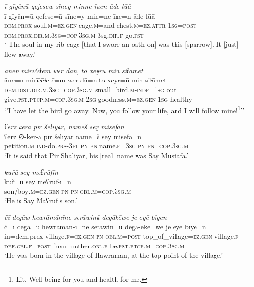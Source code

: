 \ea \label{DP.49}
\textit{ī gīyānū qefesew sīney minne īnen āđe lūā} \\ 
\gll ī gīyān=ū qefese=ū sīne=y min=ne īne=n āđe lūā \\ 
 \textsc{dem.prox} soul\textsc{.m}\textsc{=ez}\textsc{.gen} cage\textsc{.m}=and chest\textsc{.m}\textsc{=ez}.\textsc{attr} \textsc{1sg}\textsc{=\textsc{post}} \textsc{dem.prox}\textsc{.dir}\textsc{.m}\textsc{.3sg}\textsc{=cop}\textsc{.3sg}\textsc{.m} 3sg\textsc{.dir}\textsc{\textsc{.f}} go\textsc{.pst} \\ 
\glt ` The soul in my rib cage [that I swore an oath on] was this [sparrow]. It [just] flew away.'
\z 
 
\ea \label{DP.50}
\textit{ānen mirīčēɫēm wer dān, to xeyrū min siɫāmet} \\ 
\gll āne=n mirīčēɫe-ē=m wer dā=n to xeyr=ū min siɫāmet \\ 
 \textsc{dem.dist}\textsc{.dir}\textsc{.m}\textsc{.3sg}\textsc{=cop}\textsc{.3sg}\textsc{.m} small\_bird\textsc{.m}\textsc{-indf}\textsc{=1sg} out give\textsc{.pst}\textsc{.ptcp}\textsc{.m}\textsc{=cop}\textsc{.3sg}\textsc{.m} \textsc{2sg} goodness\textsc{.m}\textsc{=ez}\textsc{.gen} \textsc{1sg} healthy \\ 
\glt `’I have let the bird go away. Now, you follow your life, and I will follow mine!\footnote{Lit. Well-being for you and health for me.}’'
\z 
 
\ea \label{ZP.1}
\textit{ʕerz kerā pīr šelīyār, nāmēš sey misefān} \\ 
\gll ʕerz ∅-ker-ā pīr šelīyār nāmē=š sey misefā=n \\ 
 petition\textsc{.m} \textsc{ind-}do\textsc{.prs}\textsc{-3pl} \textsc{pn} \textsc{pn} name\textsc{.f}\textsc{=3sg} \textsc{pn} \textsc{pn}\textsc{=cop}\textsc{.3sg}\textsc{.m} \\ 
\glt `It is said that Pir Shaliyar, his [real] name was Say Mustafa.'
\z 
 
\ea \label{ZP.2}
\textit{kuřū sey meʕrūfīn} \\ 
\gll kuř=ū sey meʕrūf-ī=n \\ 
 son/boy\textsc{.m}\textsc{\textsc{=ez.gen}} \textsc{pn} \textsc{pn}\textsc{-obl}\textsc{.m}\textsc{=cop}\textsc{.3sg}\textsc{.m} \\ 
\glt `He is Say Maʕruf’s son.'
\z 
 
\ea \label{ZP.3}
\textit{čī degāw hewrāmānīne serāwinū degākēwe je eyē bīyen} \\ 
\gll č=ī degā=ū hewrāmān-ī=ne serāwin=ū degā-ekē=we je eyē bīye=n \\ 
 in=dem.prox village\textsc{.f}\textsc{\textsc{=ez.gen}} \textsc{pn}\textsc{-obl}\textsc{.m}\textsc{=\textsc{post}} top\_of\_village\textsc{\textsc{=ez.gen}} village\textsc{.f}\textsc{-def}\textsc{.obl}\textsc{.f}\textsc{=\textsc{post}} from mother\textsc{.obl}\textsc{.f} be\textsc{.pst}\textsc{.ptcp}\textsc{.m}\textsc{=cop}\textsc{.3sg}\textsc{.m} \\ 
\glt `He was born in the village of Hawraman, at the top point of the village.'
\z 
 
